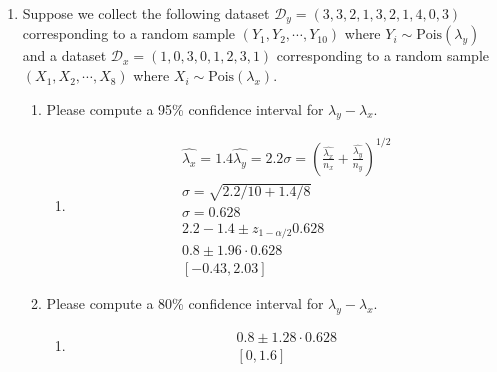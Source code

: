 \documentclass[krantz1,ChapterTOCs]{krantz}
\begin{document}
\begin{enumerate}
\begin{enumerate}
\begin{enumerate}
{            }
        \end{enumerate}
        
    \end{enumerate}
    
    \item Suppose we collect the following dataset $\mathcal{D}_{y} = (3,3,2,1,3,2,1,4,0,3)$ corresponding to a random sample $(Y_{1},Y_{2},\cdots,Y_{10})$ where $Y_{i} \sim \text{Pois}(\lambda_{y})$ and a dataset $\mathcal{D}_{x} = (1, 0, 3, 0, 1, 2, 3, 1)$ corresponding to a random sample $(X_{1},X_{2},\cdots,X_{8})$ where $X_{i} \sim \text{Pois}(\lambda_{x})$.
    
    \begin{enumerate}
        \item Please compute a 95\% confidence interval for $\lambda_{y} - \lambda_{x}$.
        \begin{enumerate}
            \item {\color{red}
                \begin{align}
                    \hat{\lambda_{x}} = 1.4
                    \hat{\lambda_{y}} = 2.2
                    \sigma = \left(\frac{ \hat{\lambda_{x}} }{n_{x}} + \frac{ \hat{\lambda_{y}} }{n_{y}} \right)^{1/2} \\ 
                    \sigma = \sqrt{2.2/10 + 1.4/8} \\
                    \sigma = 0.628 \\
                    2.2 - 1.4 \pm z_{1-\alpha/2} 0.628 \\ 
                    0.8 \pm 1.96 \cdot 0.628 \\ 
                    [-0.43, 2.03 ]
                \end{align}
            }
        \end{enumerate}
    
        
        \item Please compute a 80\% confidence interval for $\lambda_{y} - \lambda_{x}$.
        \begin{enumerate}
            \item {\color{red} 
                \begin{align}
                    0.8 \pm 1.28 \cdot 0.628 \\ 
                    [ 0 , 1.6 ]
                \end{align}
            
            }
        \end{enumerate}
    

\end{enumerate}
\end{enumerate}
\end{document}

